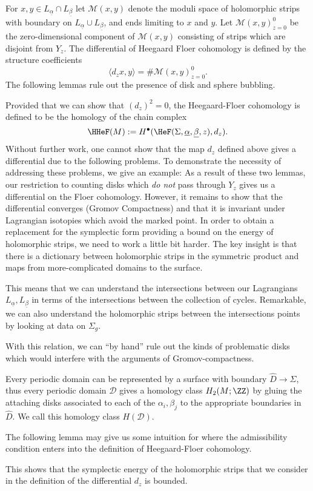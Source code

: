 For $x, y\in L_{\underline \alpha}\cap L_{\underline \beta}$ let $\mathcal M(x, y)$ denote the moduli space of holomorphic strips with boundary on $L_{\underline \alpha}\cup L_{\underline \beta}$, and ends limiting to $x$ and $y$. Let $\mathcal M(x, y)_{z=0}^0$ be the zero-dimensional component of $\mathcal M(x, y)$ consisting of strips which are disjoint from $Y_z$. The differential of Heegaard Floer cohomology is defined by the structure coefficients
\[\langle d_zx , y \rangle = \#\mathcal M(x, y)_{z=0}^0.\]
The following lemmas rule out the presence of disk and sphere bubbling.


Provided that we can show that $(d_z)^2=0$, the Heegaard-Floer cohomology is defined to be the homology of the chain complex
\[\HHeF(M):= H^\bullet(\HeF(\Sigma, \underline \alpha, \underline \beta ,z), d_z).\]
 Without further work, one cannot show that the map $d_z$ defined above gives a differential due to the following problems.
To demonstrate the necessity of addressing these problems, we give an example:
As a result of these two lemmas, our restriction to counting disks which \emph{do not} pass through $Y_z$ gives us a differential on the Floer cohomology. However, it remains to show that the differential converges (Gromov Compactness) and that it is invariant under Lagrangian isotopies which avoid the marked point. 
In order to obtain a replacement for the symplectic form providing a bound on the energy of holomorphic strips, we need to work a little bit harder. The key insight is that there is a dictionary between holomorphic strips in the symmetric product and maps from more-complicated domains to the surface.

This means that we can understand the intersections between our Lagrangians $L_{\underline \alpha}, L_{\underline \beta}$ in terms of the intersections between the collection of cycles. Remarkable, we can also understand the holomorphic strips between the intersections points by looking at data on $\Sigma_g$. 

With this relation, we can ``by hand'' rule out the kinds of problematic disks which would interfere with the arguments of Gromov-compactness.


    Every periodic domain can be represented by a surface with boundary $\hat D\to \Sigma$, thus every periodic domain $\mathcal D$ gives a homology class $H_2(M; \ZZ)$ by gluing the attaching disks associated to each of the $\alpha_i, \beta_j$ to the appropriate boundaries in $\hat D$. We call this homology class $H(\mathcal D)$.

The following lemma may give us some intuition for where the admissibility condition enters into the definition of Heegaard-Floer cohomology.


This shows that the symplectic energy of the holomorphic strips that we consider in the definition of the differential $d_z$ is bounded. 

